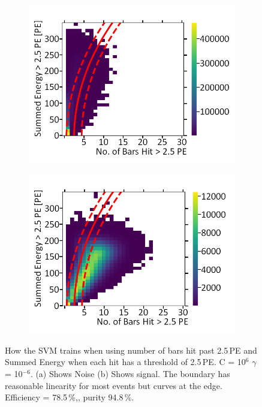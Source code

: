 \begin{figure}[!h]
\centering
\begin{subfigure}{.5\textwidth}
  \centering
  \includegraphics[width=\linewidth]{Appendix1/Figs/Bars1Sum1Noise.png}
  \captionsetup{width=.9\linewidth}
  \caption{}
  \label{subFig:Bars1Sum1N}
\end{subfigure}%
\begin{subfigure}{.5\textwidth}
  \centering
\includegraphics[width=\linewidth]{Appendix1/Figs/Bars1Sum1Signal.png}
  \captionsetup{width=.9\linewidth}
  \caption{}
  \label{subFig:Bars1Sum1S}
\end{subfigure}
\caption{How the SVM trains when using number of bars hit past 2.5\,PE and Summed Energy when each hit has a threshold of 2.5\,PE. C = 10$^6$ $\gamma$ = 10$^{-6}$. (a) Shows Noise (b) Shows signal. The boundary has reasonable linearity for most events but curves at the edge. Efficiency = 78.5\,\%,, purity 94.8\,\%.}
\label{fig:Bars1Sum1SN}
\end{figure}

